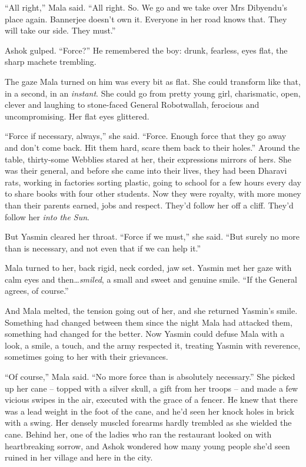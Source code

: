``All right,'' Mala said. ``All right. So. We go and we take over Mrs
Dibyendu's place again. Bannerjee doesn't own it. Everyone in her
road knows that. They will take our side. They must.''

Ashok gulped. ``Force?'' He remembered the boy: drunk, fearless, eyes
flat, the sharp machete trembling.

The gaze Mala turned on him was every bit as flat. She could
transform like that, in a second, in an \emph{instant}. She could
go from pretty young girl, charismatic, open, clever and laughing
to stone-faced General Robotwallah, ferocious and uncompromising.
Her flat eyes glittered.

``Force if necessary, always,'' she said. ``Force. Enough force that
they go away and don't come back. Hit them hard, scare them back to
their holes.'' Around the table, thirty-some Webblies stared at her,
their expressions mirrors of hers. She was their general, and
before she came into their lives, they had been Dharavi rats,
working in factories sorting plastic, going to school for a few
hours every day to share books with four other students. Now they
were royalty, with more money than their parents earned, jobs and
respect. They'd follow her off a cliff. They'd follow her
\emph{into the Sun}.

But Yasmin cleared her throat. ``Force if we must,'' she said. ``But
surely no more than is necessary, and not even that if we can help
it.''

Mala turned to her, back rigid, neck corded, jaw set. Yasmin met
her gaze with calm eyes and then\ldots{}\emph{smiled}, a small and sweet
and genuine smile. ``If the General agrees, of course.''

And Mala melted, the tension going out of her, and she returned
Yasmin's smile. Something had changed between them since the night
Mala had attacked them, something had changed for the better. Now
Yasmin could defuse Mala with a look, a smile, a touch, and the
army respected it, treating Yasmin with reverence, sometimes going
to her with their grievances.

``Of course,'' Mala said. ``No more force than is absolutely
necessary.'' She picked up her cane -- topped with a silver skull, a
gift from her troops -- and made a few vicious swipes in the air,
executed with the grace of a fencer. He knew that there was a lead
weight in the foot of the cane, and he'd seen her knock holes in
brick with a swing. Her densely muscled forearms hardly trembled as
she wielded the cane. Behind her, one of the ladies who ran the
restaurant looked on with heartbreaking sorrow, and Ashok wondered
how many young people she'd seen ruined in her village and here in
the city.

